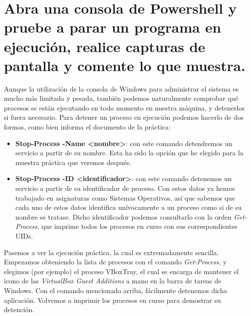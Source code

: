 \section{Abra una consola de Powershell y pruebe a parar un programa en ejecución, realice capturas de pantalla y comente lo que muestra.}
Aunque la utilización de la consola de Windows para administrar el sistema es mucho más limitada y pesada, también podemos naturalmente comprobar qué procesos se están ejecutando en todo momento en nuestra máquina, y detenerlos si fuera necesario. Para detener un proceso en ejecución podemos hacerlo de dos formas, como bien informa el documento de la práctica:
\begin{itemize}
	\item \textbf{Stop-Process -Name <nombre>}: con este comando detendremos un servicio a partir de su nombre. Esta ha sido la opción que he elegido para la muestra práctica que veremos después.
	\item \textbf{Stop-Process -ID <identificador>}: con este comando detenemos un servicio a partir de su identificador de proceso. Con estos datos ya hemos trabajado en asignaturas como Sistemas Operativos, así que sabemos que cada uno de estos datos identifica unívocamente a un proceso como si de su nombre se tratase. Dicho identificador podemos consultarlo con la orden \emph{Get-Process}, que imprime todos los procesos en curso con sus correspondientes UIDs.
\end{itemize}
Pasemos a ver la ejecución práctica, la cual es extremadamente sencilla. Empezamos obteniendo la lista de procesos con el comando \emph{Get-Process}, y elegimos (por ejemplo) el proceso VBoxTray, el cual se encarga de mantener el icono de las \emph{VirtualBox Guest Additions} a mano en la barra de tareas de Windows. Con el comando mencionado arriba, fácilmente detenemos dicha aplicación. Volvemos a imprimir los procesos en curso para demostrar su detención.
